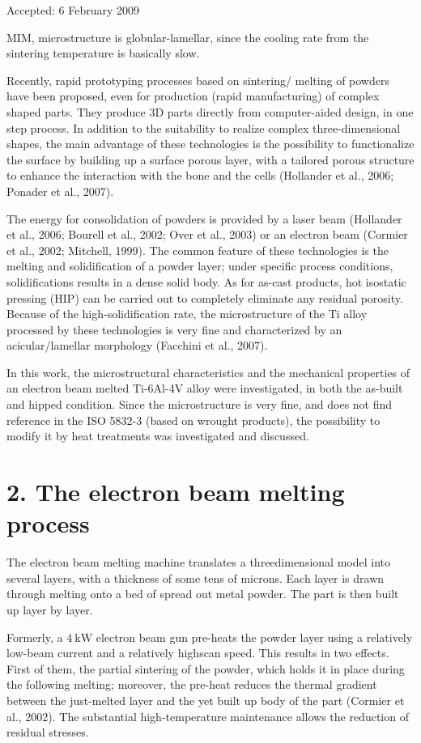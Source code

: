 \documentclass[10pt]{article}
\begin{document}
Accepted: 6 February 2009

MIM, microstructure is globular-lamellar, since the cooling rate from the sintering temperature is basically slow.

Recently, rapid prototyping processes based on sintering/ melting of powders have been proposed, even for production (rapid manufacturing) of complex shaped parts. They produce 3D parts directly from computer-aided design, in one step process. In addition to the suitability to realize complex three-dimensional shapes, the main advantage of these technologies is the possibility to functionalize the surface by building up a surface porous layer, with a tailored porous structure to enhance the interaction with the bone and the cells (Hollander et al., 2006; Ponader et al., 2007).

The energy for consolidation of powders is provided by a laser beam (Hollander et al., 2006; Bourell et al., 2002; Over et al., 2003) or an electron beam (Cormier et al., 2002; Mitchell, 1999). The common feature of these technologies is the melting and solidification of a powder layer; under specific process conditions, solidifications results in a dense solid body. As for as-cast products, hot isostatic pressing (HIP) can be carried out to completely eliminate any residual porosity. Because of the high-solidification rate, the microstructure of the $\mathrm{Ti}$ alloy processed by these technologies is very fine and characterized by an acicular/lamellar morphology (Facchini et al., 2007).

In this work, the microstructural characteristics and the mechanical properties of an electron beam melted Ti-6Al-4V alloy were investigated, in both the as-built and hipped condition. Since the microstructure is very fine, and does not find reference in the ISO 5832-3 (based on wrought products), the possibility to modify it by heat treatments was investigated and discussed.

\section*{2. The electron beam melting process}
The electron beam melting machine translates a threedimensional model into several layers, with a thickness of some tens of microns. Each layer is drawn through melting onto a bed of spread out metal powder. The part is then built up layer by layer.

Formerly, a $4 \mathrm{~kW}$ electron beam gun pre-heats the powder layer using a relatively low-beam current and a relatively highscan speed. This results in two effects. First of them, the partial sintering of the powder, which holds it in place during the following melting; moreover, the pre-heat reduces the thermal gradient between the just-melted layer and the yet built up body of the part (Cormier et al., 2002). The substantial high-temperature maintenance allows the reduction of residual stresses.
\end{document}
